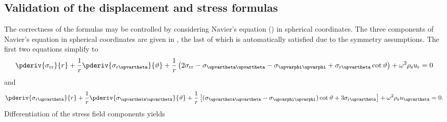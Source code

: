 \subsection{Validation of the displacement and stress formulas}
The correctness of the formulas may be controlled by considering Navier's equation () in spherical coordinates. The three components of Navier's equation in spherical coordinates are given in , the last of which is automatically satisfied due to the symmetry assumptions. The first two equations simplify to
\begin{equation}\label{Eq1:navierSphericalSimplified1}%
\pderiv{\sigma_{\mathrm{rr}}}{r} + \frac{1}{r}\pderiv{\sigma_{\mathrm{r}\upvartheta}}{\vartheta} + \frac{1}{r}\left(2\sigma_{\mathrm{r}\mathrm{r}} - \sigma_{\upvartheta\upvartheta} - \sigma_{\upvarphi\upvarphi} + \sigma_{\mathrm{r}\upvartheta}\cot\vartheta\right) +\omega^2\rho_{\mathrm{s}}u_{\mathrm{r}} = 0
\end{equation}
and
\begin{equation}\label{Eq1:navierSphericalSimplified2}
\pderiv{\sigma_{\mathrm{r}\upvartheta}}{r} + \frac{1}{r}\pderiv{\sigma_{\upvartheta\upvartheta}}{\vartheta} + \frac{1}{r}\left[(\sigma_{\upvartheta\upvartheta} - \sigma_{\upvarphi\upvarphi})\cot\vartheta + 3\sigma_{\mathrm{r}\upvartheta} \right] +\omega^2\rho_{\mathrm{s}}u_\upvartheta = 0.
\end{equation}
Differentiation of the stress field components yields
